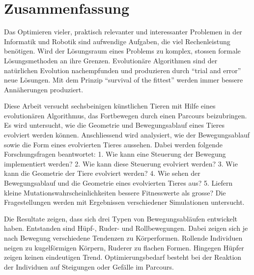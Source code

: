 %
%


\chapter{Zusammenfassung}

  Das Optimieren vieler, praktisch relevanter und interessanter Problemen
  in der Informatik und Robotik sind aufwendige Aufgaben, die viel Rechenleistung benötigen.
  Wird der Lösungsraum eines Problems zu komplex, stossen formale Lösungsmethoden an ihre Grenzen.
  Evolutionäre Algorithmen sind der natürlichen Evolution nachempfunden und
  produzieren durch ``trial and error'' neue Lösungen.
  Mit dem Prinzip ``survival of the fittest'' werden immer bessere Annäherungen produziert.

  \medskip

  Diese Arbeit versucht sechsbeinigen künstlichen Tieren mit Hilfe eines evolutionären Algorithmus,
  das Fortbewegen durch einen Parcours beizubringen.
  Es wird untersucht, wie die Geometrie und Bewegungsablauf eines Tieres evolviert werden können.
  Anschliessend wird analysiert, wie der Bewegungsablauf sowie die Form eines evolvierten Tieres aussehen.
  Dabei werden folgende Forschungsfragen beantwortet:
  1. Wie kann eine Steuerung der Bewegung implementiert werden?
  2. Wie kann diese Steuerung evolviert werden?
  3. Wie kann die Geometrie der Tiere evolviert werden?
  4. Wie sehen der Bewegungsablauf und die Geometrie eines evolvierten Tieres aus?
  5. Liefern kleine Mutationswahrscheinlichkeiten bessere Fitnesswerte als grosse?
  Die Fragestellungen werden mit Ergebnissen verschiedener Simulationen untersucht.

  \medskip

  Die Resultate zeigen, dass sich drei Typen von Bewegungsabläufen entwickelt haben.
  Entstanden sind Hüpf-, Ruder- und Rollbewegungen.
  Dabei zeigen sich je nach Bewegung verschiedene Tendenzen zu Körperformen.
  Rollende Individuen neigen zu kugelförmigen Körpern, Ruderer zu flachen Formen.
  Hingegen Hüpfer zeigen keinen eindeutigen Trend.
  Optimierungsbedarf besteht bei der Reaktion der Individuen auf Steigungen oder Gefälle im Parcours.
